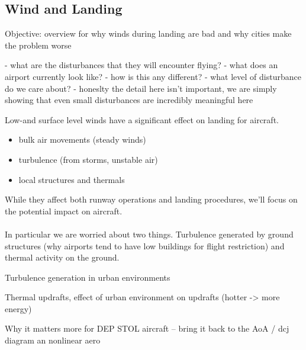 \subsection{Wind and Landing} \label{sec:winds}
Objective: overview for why winds during landing are bad and why cities make the problem worse


- what are the disturbances that they will encounter flying?
- what does an airport currently look like?
- how is this any different?
- what level of disturbance do we care about?
- honeslty the detail here isn't important, we are simply showing that even small disturbances are incredibly meaningful here

Low-and surface level winds have a significant effect on landing for aircraft. 
\begin{itemize}
	\item bulk air movements (steady winds)
	\item turbulence (from storms, unstable air)
	\item local structures and thermals
\end{itemize}
While they affect both runway operations and landing procedures, we'll focus on the potential impact on aircraft. \\
\\
In particular we are worried about two things. Turbulence generated by ground structures (why airports tend to have low buildings for flight restriction) and thermal activity on the ground. 

Turbulence generation in urban environments

Thermal updrafts, effect of urban environment on updrafts (hotter -> more energy)

Why it matters more for DEP STOL aircraft -- bring it back to the AoA / dcj diagram an nonlinear aero